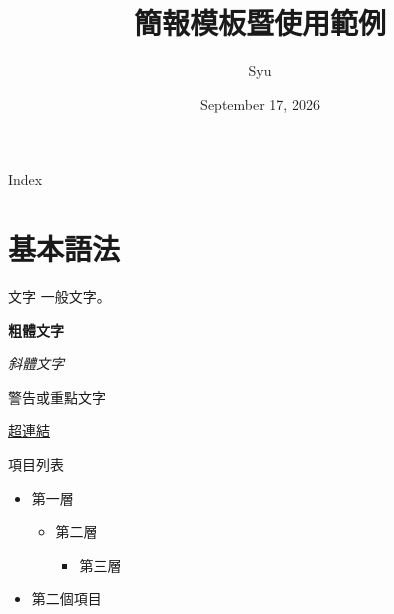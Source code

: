 \documentclass[aspectratio=169]{beamer}
\title{簡報模板暨使用範例}
\author{Syu}
\date{September 17, 2026}
\begin{document}
\begin{frame}
    \titlepage
\end{frame}


\begin{frame}{Index}
    \tableofcontents
\end{frame}


\section{基本語法}


\begin{frame}{文字}
    一般文字。
    
    \bigskip
    
    \textbf{粗體文字}
    
    \textit{斜體文字}
    
    \alert{警告或重點文字}

    \href{https://github.com/shihyousyu}{超連結}
    
\end{frame}


\begin{frame}{項目列表}
    \begin{itemize}
    
        \item 第一層
        
        \begin{itemize}
        
            \item 第二層
            
            \begin{itemize}
            
                \item 第三層
                
            \end{itemize}
            
        \end{itemize}
        
        \item 第二個項目
        
    \end{itemize}
\end{frame}
\end{document}
